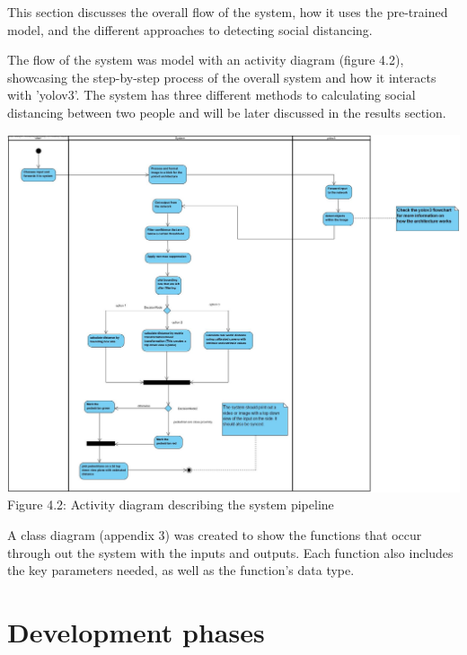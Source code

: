 \documentclass[12pt]{report}
\begin{document}
This section discusses the overall flow of the system, how it uses the pre-trained model, and the different approaches to detecting social distancing.

\vspace{2mm}

The flow of the system was model with an activity diagram (figure 4.2), showcasing the step-by-step process of the overall system and how it interacts with 'yolov3'. The system has three different methods to calculating social distancing between two people and will be later discussed in the results section.
 
\vspace{10mm}

\begin{centering}
	\includegraphics[width=170mm]{./images/system design.jpg}
	{Figure 4.2: Activity diagram describing the system pipeline}
	
\end{centering}

\vspace{10mm}

A class diagram (appendix 3) was created to show the functions that occur through out the system with the inputs and outputs. Each function also includes the key parameters needed, as well as the function's data type.

\section{Development phases}
\end{document}
